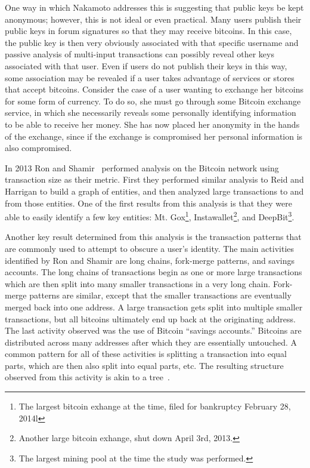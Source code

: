 \documentclass[11pt]{article}
\begin{document}
One way in which Nakamoto addresses this is suggesting that public keys be kept anonymous; however, this is not ideal or
even practical. Many users publish their public keys in forum signatures so that they may receive bitcoins.  In this
case, the public key is then very obviously associated with that specific username and passive analysis of multi-input
transactions can possibly reveal other keys associated with that user. Even if users do not publish their keys in this
way, some association may be revealed if a user takes advantage of services or stores that accept bitcoins. Consider the
case of a user wanting to exchange her bitcoins for some form of currency. To do so, she must go through some Bitcoin
exchange service, in which she necessarily reveals some personally identifying information to be able to receive her
money. She has now placed her anonymity in the hands of the exchange, since if the exchange is compromised her personal
information is also compromised.

In 2013 Ron and Shamir~\cite{ron13} performed analysis on the Bitcoin network using transaction size as their metric.
First they performed similar analysis to Reid and Harrigan to build a graph of entities, and then analyzed large
transactions to and from those entities. One of the first results from this analysis is that they were able to easily
identify a few key entities: Mt.  Gox\footnote{The largest bitcoin exhange at the time, filed for bankruptcy February
28, 2014l}, Instawallet\footnote{Another large bitcoin exhange, shut down April 3rd, 2013.}, and DeepBit\footnote{The
largest mining pool at the time the study was performed.}.

Another key result determined from this analysis is the transaction patterns that are commonly used to attempt to
obscure a user's identity. The main activities identified by Ron and Shamir are long chains, fork-merge patterns, and
savings accounts. The long chains of transactions begin as one or more large transactions which are then split into many
smaller transactions in a very long chain. Fork-merge patterns are similar, except that the smaller transactions are
eventually merged back into one address. A large transaction gets split into multiple smaller transactions, but all
bitcoins ultimately end up back at the originating address. The last activity observed was the use of Bitcoin ``savings
accounts.'' Bitcoins are distributed across many addresses after which they are essentially untouched. A common pattern
for all of these activities is splitting a transaction into equal parts, which are then also split into equal parts,
etc. The resulting structure observed from this activity is akin to a tree~\cite{ron13}.
\end{document}
